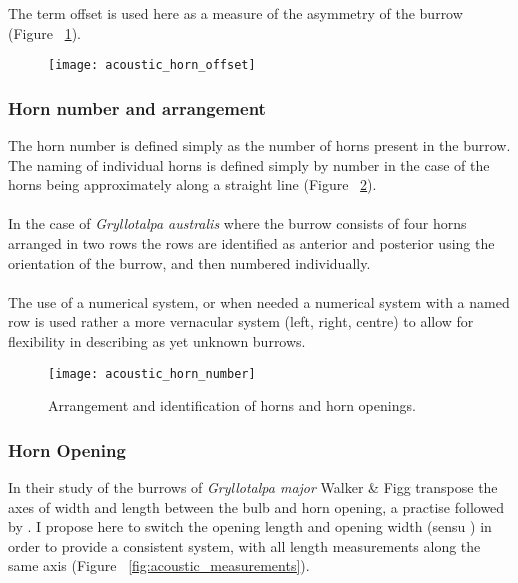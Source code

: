 \documentclass{article}
\begin{document}
   The term offset is used here as a measure of the asymmetry of the burrow (Figure ~\ref{fig:acoustic_horn_offset}).
   
   \begin{figure}[h]
   	\texttt{[image: acoustic\_horn\_offset]}
   	\caption{}
   	\label{fig:acoustic_horn_offset}
   \end{figure}
   
   \subsubsection{Horn number and arrangement}
   The horn number is defined simply as the number of horns present in the burrow. The naming of individual horns is defined simply by number in the case of the horns being approximately along a straight line (Figure ~\ref{fig:acoustic_horn_number}).
   \paragraph{}
   In the case of \textit{Gryllotalpa australis} where the burrow consists of four horns arranged in two rows the rows are identified as anterior and posterior using the orientation of the burrow, and then numbered individually.
   \paragraph{}
   The use of a numerical system, or when needed a numerical system with a named row is used rather a more vernacular system (left, right, centre) to allow for flexibility in describing as yet unknown burrows.
   
   \begin{figure}[h]
   	\texttt{[image: acoustic\_horn\_number]}
   	\caption{Arrangement and identification of horns and horn openings.}
   	\label{fig:acoustic_horn_number}
   \end{figure}
   
   \subsubsection{Horn Opening}
   In their study of the burrows of \textit{Gryllotalpa major} Walker \& Figg \cite{walker1990} transpose the axes of width and length between the bulb and horn opening, a practise followed by \cite{jafari2015}. I propose here to switch the opening length and opening width (sensu \cite{walker1990}) in order to provide a consistent system, with all length measurements along the same axis (Figure ~\ref{fig:acoustic_measurements}).
\end{document}
